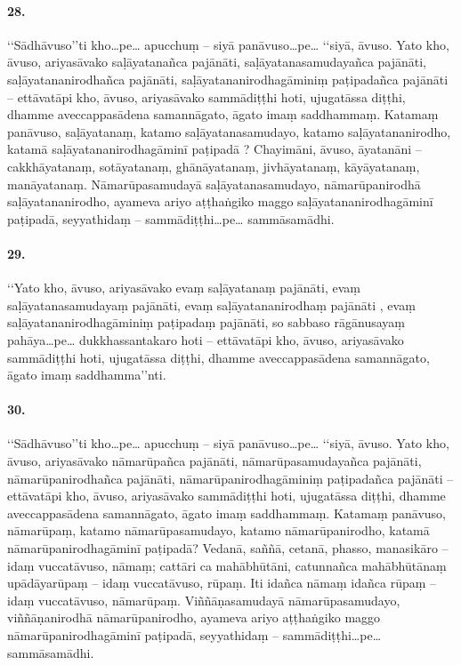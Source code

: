 \paragraph{28.} ‘‘Sādhāvuso’’ti kho…pe… apucchuṃ – siyā panāvuso…pe… ‘‘siyā, āvuso. Yato kho, āvuso, ariyasāvako saḷāyatanañca pajānāti, saḷāyatanasamudayañca pajānāti, saḷāyatananirodhañca pajānāti, saḷāyatananirodhagāminiṃ paṭipadañca pajānāti – ettāvatāpi kho, āvuso, ariyasāvako sammādiṭṭhi hoti, ujugatāssa diṭṭhi, dhamme aveccappasādena samannāgato, āgato imaṃ saddhammaṃ. Katamaṃ panāvuso, saḷāyatanaṃ, katamo saḷāyatanasamudayo, katamo saḷāyatananirodho, katamā saḷāyatananirodhagāminī paṭipadā ? Chayimāni, āvuso, āyatanāni – cakkhāyatanaṃ, sotāyatanaṃ, ghānāyatanaṃ, jivhāyatanaṃ, kāyāyatanaṃ, manāyatanaṃ. Nāmarūpasamudayā saḷāyatanasamudayo, nāmarūpanirodhā saḷāyatananirodho, ayameva ariyo aṭṭhaṅgiko maggo saḷāyatananirodhagāminī paṭipadā, seyyathidaṃ – sammādiṭṭhi…pe… sammāsamādhi.

\paragraph{29.} ‘‘Yato kho, āvuso, ariyasāvako evaṃ saḷāyatanaṃ pajānāti, evaṃ saḷāyatanasamudayaṃ pajānāti, evaṃ saḷāyatananirodhaṃ pajānāti , evaṃ saḷāyatananirodhagāminiṃ paṭipadaṃ pajānāti, so sabbaso rāgānusayaṃ pahāya…pe… dukkhassantakaro hoti – ettāvatāpi kho, āvuso, ariyasāvako sammādiṭṭhi hoti, ujugatāssa diṭṭhi, dhamme aveccappasādena samannāgato, āgato imaṃ saddhamma’’nti.

\paragraph{30.} ‘‘Sādhāvuso’’ti kho…pe… apucchuṃ – siyā panāvuso…pe… ‘‘siyā, āvuso. Yato kho, āvuso, ariyasāvako nāmarūpañca pajānāti, nāmarūpasamudayañca pajānāti, nāmarūpanirodhañca pajānāti, nāmarūpanirodhagāminiṃ paṭipadañca pajānāti – ettāvatāpi kho, āvuso, ariyasāvako sammādiṭṭhi hoti, ujugatāssa diṭṭhi, dhamme aveccappasādena samannāgato, āgato imaṃ saddhammaṃ. Katamaṃ panāvuso, nāmarūpaṃ, katamo nāmarūpasamudayo, katamo nāmarūpanirodho, katamā nāmarūpanirodhagāminī paṭipadā? Vedanā, saññā, cetanā, phasso, manasikāro – idaṃ vuccatāvuso, nāmaṃ; cattāri ca mahābhūtāni, catunnañca mahābhūtānaṃ upādāyarūpaṃ – idaṃ vuccatāvuso, rūpaṃ. Iti idañca nāmaṃ idañca rūpaṃ – idaṃ vuccatāvuso, nāmarūpaṃ. Viññāṇasamudayā nāmarūpasamudayo, viññāṇanirodhā nāmarūpanirodho, ayameva ariyo aṭṭhaṅgiko maggo nāmarūpanirodhagāminī paṭipadā, seyyathidaṃ – sammādiṭṭhi…pe… sammāsamādhi.

